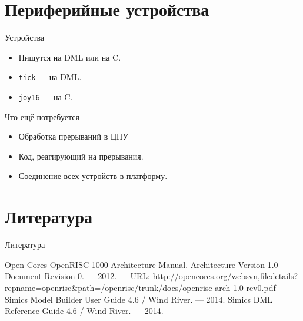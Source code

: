 \documentclass{beamer}
\begin{document}
\section{Периферийные устройства}

\begin{frame}{Устройства}

\begin{itemize}
\item Пишутся на DML или на C.
\item \texttt{tick} — на DML.
\item \texttt{joy16} — на C.
\end{itemize}

\end{frame}


\begin{frame}{Что ещё потребуется}

\begin{itemize}
\item Обработка прерываний в ЦПУ
\item Код, реагирующий на прерывания.
\item Соединение всех устройств в платформу.
\end{itemize}

\end{frame}



\section{Литература}

\begin{frame}[allowframebreaks]{Литература}
\begin{thebibliography}{99}
	  Open Cores OpenRISC 1000 Architecture Manual. Architecture Version 1.0 Document Revision 0. — 2012. — URL: \url{http://opencores.org/websvn,filedetails?repname=openrisc&path=/openrisc/trunk/docs/openrisc-arch-1.0-rev0.pdf}
	 Simics Model Builder User Guide 4.6 / Wind River. — 2014.
	 Simics DML Reference Guide 4.6 / Wind River. — 2014.
	
\end{thebibliography}
\end{frame}
\end{document}
